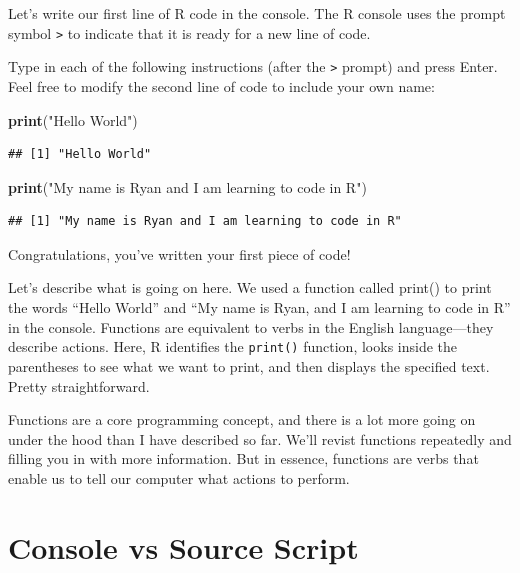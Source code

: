 \documentclass[
]{book}
\newenvironment{Shaded}{\begin{snugshade}}{\end{snugshade}}
\newcommand{\FunctionTok}[1]{\textcolor[rgb]{0.13,0.29,0.53}{\textbf{#1}}}
\newcommand{\NormalTok}[1]{#1}
\newcommand{\StringTok}[1]{\textcolor[rgb]{0.31,0.60,0.02}{#1}}
\begin{document}
Let's write our first line of R code in the console. The R console uses the prompt symbol \texttt{\textgreater{}} to indicate that it is ready for a new line of code.

Type in each of the following instructions (after the \texttt{\textgreater{}} prompt) and press Enter. Feel free to modify the second line of code to include your own name:

\begin{Shaded}
\begin{Highlighting}[]
\FunctionTok{print}\NormalTok{(}\StringTok{"Hello World"}\NormalTok{)}
\end{Highlighting}
\end{Shaded}

\begin{verbatim}
## [1] "Hello World"
\end{verbatim}

\begin{Shaded}
\begin{Highlighting}[]
\FunctionTok{print}\NormalTok{(}\StringTok{"My name is Ryan and I am learning to code in R"}\NormalTok{)}
\end{Highlighting}
\end{Shaded}

\begin{verbatim}
## [1] "My name is Ryan and I am learning to code in R"
\end{verbatim}

Congratulations, you've written your first piece of code!

Let's describe what is going on here. We used a function called print() to print the words ``Hello World'' and ``My name is Ryan, and I am learning to code in R'' in the console. Functions are equivalent to verbs in the English language---they describe actions. Here, R identifies the \texttt{print()} function, looks inside the parentheses to see what we want to print, and then displays the specified text. Pretty straightforward.

Functions are a core programming concept, and there is a lot more going on under the hood than I have described so far. We'll revist functions repeatedly and filling you in with more information. But in essence, functions are verbs that enable us to tell our computer what actions to perform.

\section{Console vs Source Script}\label{console-vs-source-script}
\end{document}
